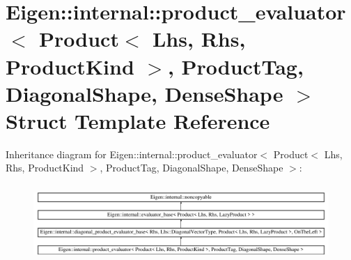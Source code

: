 \hypertarget{struct_eigen_1_1internal_1_1product__evaluator_3_01_product_3_01_lhs_00_01_rhs_00_01_product_kinb2964e3ecd5359c634047e003305b765}{}\section{Eigen\+::internal\+::product\+\_\+evaluator$<$ Product$<$ Lhs, Rhs, Product\+Kind $>$, Product\+Tag, Diagonal\+Shape, Dense\+Shape $>$ Struct Template Reference}
\label{struct_eigen_1_1internal_1_1product__evaluator_3_01_product_3_01_lhs_00_01_rhs_00_01_product_kinb2964e3ecd5359c634047e003305b765}
Inheritance diagram for Eigen\+::internal\+::product\+\_\+evaluator$<$ Product$<$ Lhs, Rhs, Product\+Kind $>$, Product\+Tag, Diagonal\+Shape, Dense\+Shape $>$\+:\begin{figure}[H]
\begin{center}
\leavevmode
\includegraphics[height=2.912874cm]{struct_eigen_1_1internal_1_1product__evaluator_3_01_product_3_01_lhs_00_01_rhs_00_01_product_kinb2964e3ecd5359c634047e003305b765}
\end{center}
\end{figure}
